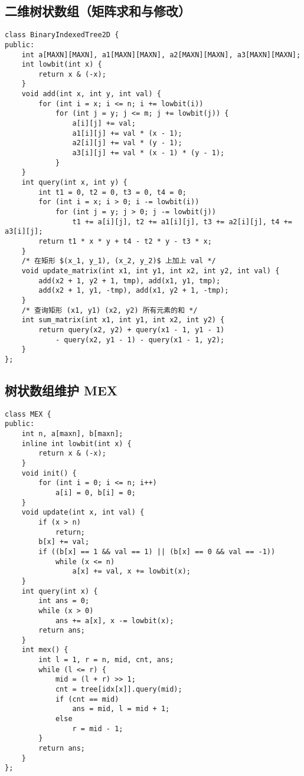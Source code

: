 \subsection{二维树状数组（矩阵求和与修改）}
\begin{verbatim}
class BinaryIndexedTree2D {
public:
    int a[MAXN][MAXN], a1[MAXN][MAXN], a2[MAXN][MAXN], a3[MAXN][MAXN];
    int lowbit(int x) {
        return x & (-x);
    }
    void add(int x, int y, int val) {
        for (int i = x; i <= n; i += lowbit(i))
            for (int j = y; j <= m; j += lowbit(j)) {
                a[i][j] += val;
                a1[i][j] += val * (x - 1);
                a2[i][j] += val * (y - 1);
                a3[i][j] += val * (x - 1) * (y - 1);
            }
    }
    int query(int x, int y) {
        int t1 = 0, t2 = 0, t3 = 0, t4 = 0;
        for (int i = x; i > 0; i -= lowbit(i))
            for (int j = y; j > 0; j -= lowbit(j))
                t1 += a[i][j], t2 += a1[i][j], t3 += a2[i][j], t4 += a3[i][j];
        return t1 * x * y + t4 - t2 * y - t3 * x;
    }
    /* 在矩形 $(x_1, y_1), (x_2, y_2)$ 上加上 val */
    void update_matrix(int x1, int y1, int x2, int y2, int val) {
        add(x2 + 1, y2 + 1, tmp), add(x1, y1, tmp);
        add(x2 + 1, y1, -tmp), add(x1, y2 + 1, -tmp);
    }
    /* 查询矩形 (x1, y1) (x2, y2) 所有元素的和 */
    int sum_matrix(int x1, int y1, int x2, int y2) {
        return query(x2, y2) + query(x1 - 1, y1 - 1)
            - query(x2, y1 - 1) - query(x1 - 1, y2);
    }
};
\end{verbatim}

\subsection{树状数组维护 MEX}
\begin{verbatim}
class MEX {
public:
    int n, a[maxn], b[maxn];    
    inline int lowbit(int x) {
        return x & (-x);
    }
    void init() {
        for (int i = 0; i <= n; i++)
            a[i] = 0, b[i] = 0;
    }
    void update(int x, int val) {
        if (x > n)
            return;
        b[x] += val;
        if ((b[x] == 1 && val == 1) || (b[x] == 0 && val == -1))
            while (x <= n)
                a[x] += val, x += lowbit(x);
    }
    int query(int x) {
        int ans = 0;
        while (x > 0)
            ans += a[x], x -= lowbit(x);
        return ans;
    }
    int mex() {
        int l = 1, r = n, mid, cnt, ans;
        while (l <= r) {
            mid = (l + r) >> 1;
            cnt = tree[idx[x]].query(mid);
            if (cnt == mid)
                ans = mid, l = mid + 1;
            else
                r = mid - 1;
        }
        return ans;
    }
};
\end{verbatim}
\clearpage
